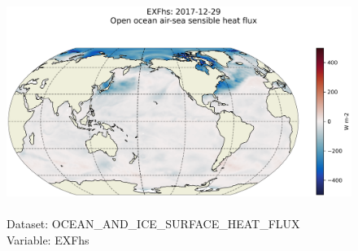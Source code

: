 \begin{figure}[H]
\centering
\includegraphics[scale=0.5]{../images/plots/latlon_plots/Ocean_and_Sea-Ice_Surface_Heat_Fluxes/EXFhs.png}
\caption{\\Dataset: OCEAN\_AND\_ICE\_SURFACE\_HEAT\_FLUX\\Variable: EXFhs}
\label{tab:table-OCEAN_AND_ICE_SURFACE_HEAT_FLUX_EXFhs-Plot}
\end{figure}
\pagebreak

